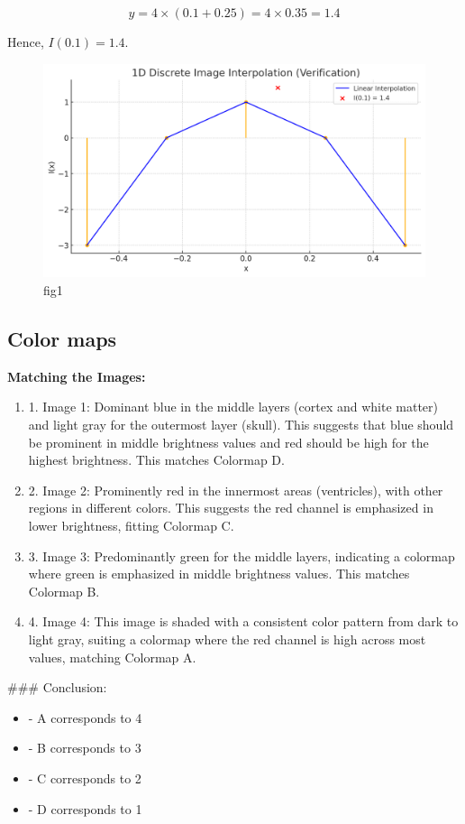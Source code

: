 \documentclass{article}
\begin{document}
\[
y = 4 \times (0.1 + 0.25) = 4 \times 0.35 = 1.4
\]

Hence, \( I(0.1) = 1.4 \).

\begin{figure}[h!]
    \centering
    \includegraphics[width=0.5\linewidth]{fig1.png}
    \caption{fig1}
\end{figure}

\subsection{Color maps}

\textbf{Matching the Images:}
\begin{enumerate}
    \item 1. Image 1: Dominant blue in the middle layers (cortex and white matter) and light gray for the outermost layer (skull). This suggests that blue should be prominent in middle brightness values and red should be high for the highest brightness. This matches Colormap D.
    \item 2. Image 2: Prominently red in the innermost areas (ventricles), with other regions in different colors. This suggests the red channel is emphasized in lower brightness, fitting Colormap C.
    \item 3. Image 3: Predominantly green for the middle layers, indicating a colormap where green is emphasized in middle brightness values. This matches Colormap B.
    \item 4. Image 4: This image is shaded with a consistent color pattern from dark to light gray, suiting a colormap where the red channel is high across most values, matching Colormap A.
\end{enumerate}

### Conclusion:
\begin{itemize}
    \item - A corresponds to 4
    \item - B corresponds to 3
    \item - C corresponds to 2
    \item - D corresponds to 1
\end{itemize}
\end{document}

